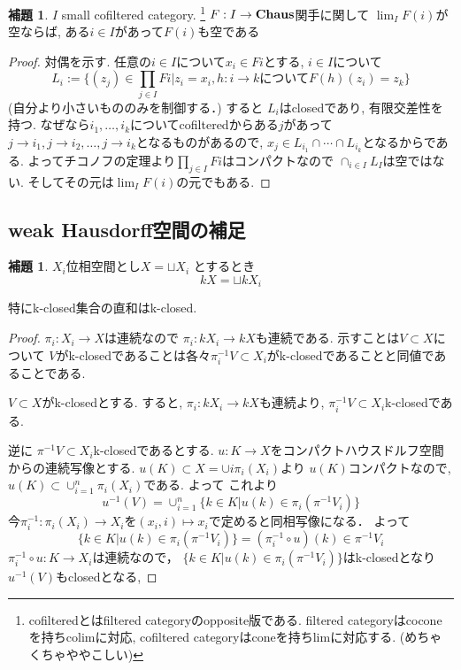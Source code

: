 \documentclass[dvipdfmx,a4paper,11pt]{article}
\theoremstyle{definition}
\newtheorem{lem}[thm]{補題}
\begin{document}
 
   \begin{tcolorbox}
 [colback = white, colframe = green!35!black, fonttitle = \bfseries,breakable = true]
\begin{lem}
\label{lem-cpthaus}
$I$ small cofiltered category. \footnote{cofilteredとはfiltered categoryのopposite版である. filtered categoryはcoconeを持ちcolimに対応, cofiltered categoryはconeを持ちlimに対応する. (めちゃくちゃややこしい)}
$F :  I \to {\bf Chaus}$関手に関して
$\lim_{I}F(i)$が空ならば, ある$i \in I$があって$F(i)$も空である
\end{lem}
\end{tcolorbox}
\begin{proof}
対偶を示す. 
任意の$i \in I$について$x_i \in Fi$とする, 
$i \in I$について
$$
L_i := \{(z_j) \in \prod_{j \in I}{Fi} | z_i =x_i, \text{$h : i \to k$について$F(h)(z_i) = z_k$}\}
$$
(自分より小さいもののみを制御する．)
すると
$L_i$はclosedであり, 有限交差性を持つ.
なぜなら$i_1, \ldots, i_k$についてcofilteredからある$j$があって
$j \to i_1, j\to i_2, \ldots , j\to i_k$となるものがあるので, $x_j \in L_{i_1}\cap \cdots \cap L_{i_k}$となるからである. 
よってチコノフの定理より$\prod_{j \in I}{Fi} $はコンパクトなので
$\cap_{i \in I} L_I$は空ではない.
そしてその元は$\lim_{I}F(i)$の元でもある.
\end{proof}



\subsection{weak Hausdorff空間の補足}


\begin{tcolorbox}
 [colback = white, colframe = green!35!black, fonttitle = \bfseries,breakable = true]
\begin{lem}
\label{lem-k-space}
$X_i$位相空間とし$X = \sqcup X_{i}$
とするとき
$$
kX = \sqcup kX_i
$$

特にk-closed集合の直和はk-closed.
\end{lem}
\end{tcolorbox}
\begin{proof}
$\pi_i : X_i \to X$は連続なので
$\pi_i : kX_i \to kX$も連続である.
示すことは$V \subset X$について
$V$がk-closedであることは各々$\pi_{i}^{-1}V \subset X_i$がk-closedであることと同値であることである. 

$V \subset X$がk-closedとする.
すると, $\pi_{i}: kX_i \to kX$も連続より, $\pi_{i}^{-1}V \subset X_i$k-closedである.

逆に $\pi^{-1}V \subset X_i$k-closedであるとする. 
$u : K\to X$をコンパクトハウスドルフ空間からの連続写像とする. 
$u(K) \subset X = \cup{i}\pi_{i}(X_i)$より
$u(K)$コンパクトなので, $u(K) \subset \cup_{i=1}^{n}\pi_{i}(X_i)$である.
よって
これより
$$
u^{-1}(V)
=\cup_{i=1}^{n}\{ k \in K | u(k) \in \pi_{i}( \pi^{-1}V_i) \}
$$
今$\pi_{i}^{-1}: \pi_{i}(X_i) \to X_i$を$(x_i, i) \mapsto x_i$で定めると同相写像になる．
よって
$$
\{ k \in K | u(k) \in \pi_{i}( \pi^{-1}V_i) \}
=
(\pi_{i}^{-1}\circ u)(k) \in \pi^{-1}V_i
$$
$\pi_{i}^{-1}\circ u : K \to X_i$は連続なので， $\{ k \in K | u(k) \in \pi_{i}( \pi^{-1}V_i) \}$はk-closedとなり
$u^{-1}(V)$もclosedとなる, 
\end{proof}
\end{document}
